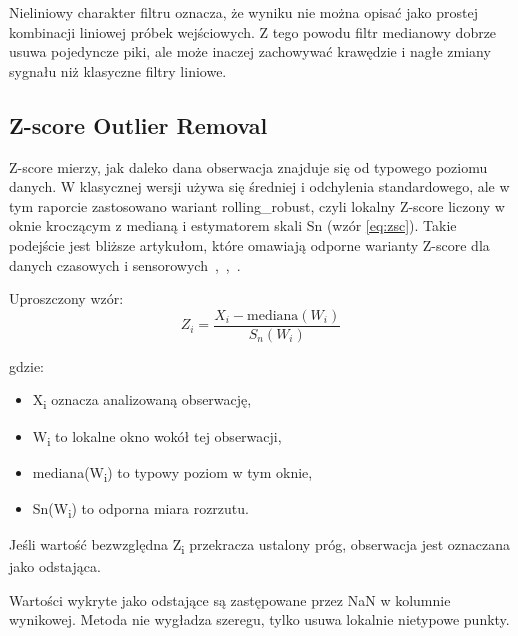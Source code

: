 \documentclass[12pt,twoside]{article}
\begin{document}
Nieliniowy charakter filtru
oznacza, że wyniku nie można opisać jako prostej kombinacji
liniowej próbek wejściowych. Z tego powodu filtr medianowy dobrze
usuwa pojedyncze piki, ale może inaczej zachowywać krawędzie i
nagłe zmiany sygnału niż klasyczne filtry liniowe.




\subsection{Z-score Outlier Removal}


Z-score mierzy, jak daleko dana obserwacja
znajduje się od typowego poziomu danych. W klasycznej wersji używa
się średniej i odchylenia standardowego, ale w tym raporcie
zastosowano wariant rolling\_robust, czyli lokalny Z-score liczony w
oknie kroczącym z medianą i estymatorem skali Sn (wzór \ref{eq:zsc}). Takie podejście
jest bliższe artykułom, które omawiają odporne warianty Z-score
dla danych czasowych i sensorowych~\cite{bib:ioe2},~\cite{bib:ioe4},~\cite{bib:ioe7}.


Uproszczony wzór:
\begin{equation}
\label{eq:zsc}
Z_i = \frac{X_i - \text{mediana}(W_i)}{S_n(W_i)}
\end{equation}

gdzie:


\begin{itemize}

	\item X\textsubscript{i}
	oznacza analizowaną obserwację,



	\item W\textsubscript{i}
	to lokalne okno wokół tej obserwacji,



	\item mediana(W\textsubscript{i})
	to typowy poziom w tym oknie,



	\item Sn(W\textsubscript{i}) to odporna miara rozrzutu.



\end{itemize}

Jeśli wartość bezwzględna
Z\textsubscript{i}
przekracza ustalony próg, obserwacja jest oznaczana jako odstająca.


Wartości wykryte jako
odstające są zastępowane przez NaN w kolumnie wynikowej. Metoda
nie wygładza szeregu, tylko usuwa lokalnie nietypowe punkty.
\end{document}
